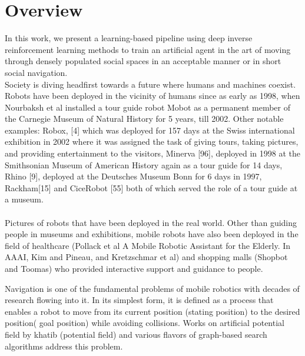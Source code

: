 \label{ch:introduction}
\section{Overview}
In this work, we present a learning-based pipeline using deep inverse reinforcement learning methods to train an artificial agent in the art of moving through densely populated social spaces in an acceptable manner or in short social navigation.\\
Society is diving headfirst towards a future where humans and machines coexist. Robots have been deployed in the vicinity of humans since as early as 1998, when Nourbaksh et al installed a tour guide robot Mobot as a permanent member of the Carnegie Museum of Natural History for 5 years, till 2002. Other notable examples: Robox, [4] which was deployed for 157 days at the Swiss international exhibition in 2002 where it was assigned the task of giving tours, taking pictures, and providing entertainment to the visitors, Minerva [96], deployed in 1998 at the Smithsonian Museum of American History again as a tour guide for 14 days, Rhino [9], deployed at the Deutsches Museum Bonn for 6 days in 1997, Rackham[15] and CiceRobot [55] both of which served the role of a tour guide at a museum. \\
\\Pictures of robots that have been deployed in the real world.
Other than guiding people in museums and exhibitions, mobile robots have also been deployed in the field of healthcare (Pollack et al A Mobile Robotic Assistant for the Elderly. In AAAI, Kim and Pineau, and Kretzschmar et al) and shopping malls (Shopbot and Toomas) who provided interactive support and guidance to people. 



Navigation is one of the fundamental problems of mobile robotics with decades of research flowing into it. In its simplest form, it is defined as a process that enables a robot to move from its current position (stating position) to the desired position( goal position) while avoiding collisions. Works on artificial potential field by khatib (potential field) and various flavors of graph-based search algorithms address this problem.\\

